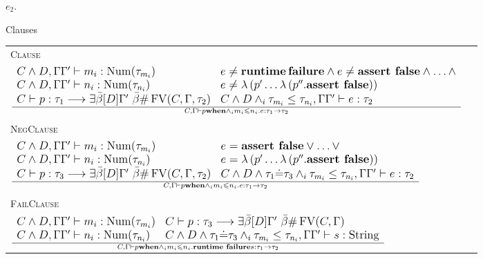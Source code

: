 \documentclass{article}
\newcommand{\tmmathbf}[1]{\ensuremath{\boldsymbol{#1}}}
\newcommand{\tmname}[1]{\textsc{#1}}
\newcommand{\tmop}[1]{\ensuremath{\operatorname{#1}}}
\newcommand{\tmstrong}[1]{\textbf{#1}}
\begin{document}
$e_2$.\begin{table}[t]
  Clauses
  
  \begin{tabular}{ll}
    {\tmname{Clause}} & \\
    $\large{\frac{\begin{array}{ll}
      C \wedge D, \Gamma \Gamma^{\prime} \vdash m_i : \tmop{Num} (\tau_{m_i})
      & e \neq \tmmathbf{\tmop{runtime} \tmop{failure}} \wedge e \neq
      \text{{\tmstrong{assert false}}} \wedge \ldots \wedge\\
      C \wedge D, \Gamma \Gamma^{\prime} \vdash n_i : \tmop{Num} (\tau_{n_i})
      & e \neq \lambda \left( p^{\prime} \ldots \lambda \left(
      p^{\prime\prime} . \text{{\tmstrong{assert false}}} \right) \right)\\
      C \vdash p : \tau_1 \longrightarrow \exists \bar{\beta} [D]
      \Gamma^{\prime} \text{ } \bar{\beta} \# \tmop{FV} (C, \Gamma, \tau_2) &
      C \wedge D \wedge_i \tau_{m_i} \leq \tau_{n_i}, \Gamma \Gamma^{\prime}
      \vdash e : \tau_2
    \end{array}}{C, \Gamma \vdash p \text{{\tmstrong{when}}} \wedge_i m_i
    \leqslant n_i .e : \tau_1 \rightarrow \tau_2}}$ & \\
    & \\
    {\tmname{NegClause}} & \\
    $\large{\frac{\begin{array}{ll}
      C \wedge D, \Gamma \Gamma^{\prime} \vdash m_i : \tmop{Num} (\tau_{m_i})
      & e = \text{{\tmstrong{assert false}}} \vee \ldots \vee\\
      C \wedge D, \Gamma \Gamma^{\prime} \vdash n_i : \tmop{Num} (\tau_{n_i})
      & e = \lambda \left( p^{\prime} \ldots \lambda \left( p^{\prime\prime} .
      \text{{\tmstrong{assert false}}} \right) \right)\\
      C \vdash p : \tau_3 \longrightarrow \exists \bar{\beta} [D]
      \Gamma^{\prime} \text{ } \bar{\beta} \# \tmop{FV} (C, \Gamma, \tau_2) &
      C \wedge D \wedge \tau_1 \dot{=} \tau_3 \wedge_i \tau_{m_i} \leq
      \tau_{n_i}, \Gamma \Gamma^{\prime} \vdash e : \tau_2
    \end{array}}{C, \Gamma \vdash p \text{{\tmstrong{when}}} \wedge_i m_i
    \leqslant n_i .e : \tau_1 \rightarrow \tau_2}}$ & \\
    & \\
    {\tmname{FailClause}} & \\
    $\large{\frac{\begin{array}{ll}
      C \wedge D, \Gamma \Gamma^{\prime} \vdash m_i : \tmop{Num} (\tau_{m_i})
      & C \vdash p : \tau_3 \longrightarrow \exists \bar{\beta} [D]
      \Gamma^{\prime} \text{ } \bar{\beta} \# \tmop{FV} (C, \Gamma)\\
      C \wedge D, \Gamma \Gamma^{\prime} \vdash n_i : \tmop{Num} (\tau_{n_i})
      & C \wedge D \wedge \tau_1 \dot{=} \tau_3 \wedge_i \tau_{m_i} \leq
      \tau_{n_i}, \Gamma \Gamma^{\prime} \vdash s : \tmop{String}
    \end{array}}{C, \Gamma \vdash p \text{{\tmstrong{when}}} \wedge_i m_i
    \leqslant n_i . \text{{\tmstrong{runtime failure}}} s : \tau_1 \rightarrow
    \tau_2}}$ & 
  \end{tabular}
  

\end{table}
\end{document}
